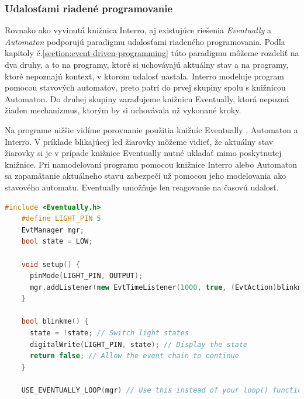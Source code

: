 \subsubsection{Udalosťami riadené programovanie}
\noindent \par
Rovnako ako vyvinutá knižnica Interro, aj existujúce riešenia \textit{Eventually} a \textit{Automaton} podporujú paradigmu udalosťami riadeného programovania. Podľa kapitoly
č.\ref{section:event-driven-programming} túto paradigmu môžeme rozdeliť na dva druhy, a to na programy, ktoré si uchovávajú aktuálny stav a na programy, ktoré nepoznajú
kontext, v ktorom udalosť nastala. Interro modeluje program pomocou stavových automatov, preto patrí do prvej skupiny spolu s knižnicou Automaton. Do druhej skupiny
zaraďujeme knižnicu Eventually, ktorá nepozná žiaden mechanizmus, ktorým by si uchovávala už vykonané kroky. \par
Na programe nižšie vidíme porovnanie použitia knižníc Eventually \cite{bartlettEventually2021}, Automaton \cite{tinkerspyAutomaton2021} a Interro. V príklade blikajúcej led žiarovky môžeme vidieť,
že aktuálny stav žiarovky si je v prípade knižnice Eventually nutné ukladať mimo poskytnutej knižnice. Pri namodelovaní programu pomocou knižnice Interro alebo Automaton
sa zapamätanie aktuálneho stavu zabezpečí už pomocou jeho modelovania ako stavového automatu. Eventually umožňuje len reagovanie na časovú udalosť.
\begin{lstlisting}[language=c++]      
    #include <Eventually.h>    
    #define LIGHT_PIN 5    
    EvtManager mgr;
    bool state = LOW;    

    void setup() {
      pinMode(LIGHT_PIN, OUTPUT);
      mgr.addListener(new EvtTimeListener(1000, true, (EvtAction)blinkme)); 
    }    

    bool blinkme() {
      state = !state; // Switch light states
      digitalWrite(LIGHT_PIN, state); // Display the state
      return false; // Allow the event chain to continue
    }    

    USE_EVENTUALLY_LOOP(mgr) // Use this instead of your loop() function.    
\end{lstlisting}

